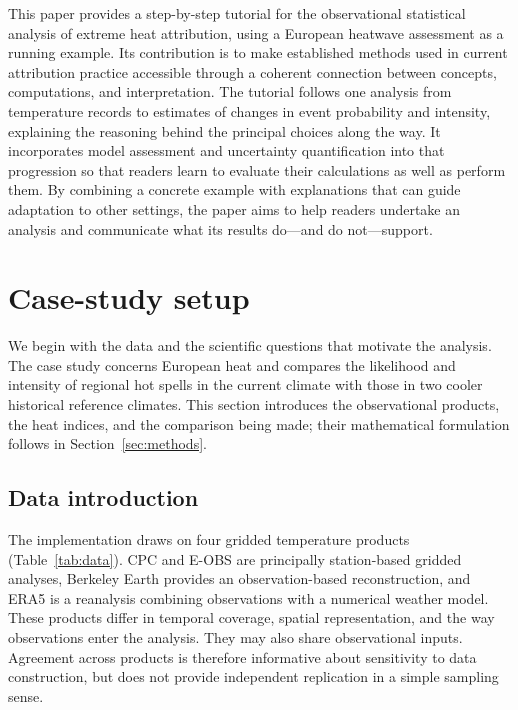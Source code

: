 \documentclass[11pt]{article}
\begin{document}
This paper provides a step-by-step tutorial for the observational
statistical analysis of extreme heat attribution, using a European
heatwave assessment as a running example. Its contribution is to make
established methods used in current attribution practice accessible
through a coherent connection between concepts, computations, and
interpretation. The tutorial follows one analysis from temperature
records to estimates of changes in event probability and intensity,
explaining the reasoning behind the principal choices along the way.
It incorporates model assessment and uncertainty quantification into
that progression so that readers learn to evaluate their calculations
as well as perform them. By combining a concrete example with
explanations that can guide adaptation to other settings, the paper
aims to help readers undertake an analysis and communicate what its
results do---and do not---support.

\section{Case-study setup}
\label{sec:setup}
We begin with the data and the scientific questions that motivate the
analysis. The case study concerns European heat and compares the
likelihood and intensity of regional hot spells in the current climate
with those in two cooler historical reference climates. This section
introduces the observational products, the heat indices, and the
comparison being made; their mathematical formulation follows in
Section~\ref{sec:methods}.

\subsection{Data introduction}
The implementation draws on four gridded temperature products
(Table~\ref{tab:data}). CPC and E-OBS are principally station-based
gridded analyses, Berkeley Earth provides an observation-based
reconstruction, and ERA5 is a reanalysis combining observations with a
numerical weather model. These products differ in temporal coverage,
spatial representation, and the way observations enter the analysis.
They may also share observational inputs. Agreement across products is
therefore informative about sensitivity to data construction, but does
not provide independent replication in a simple sampling sense.
\end{document}
